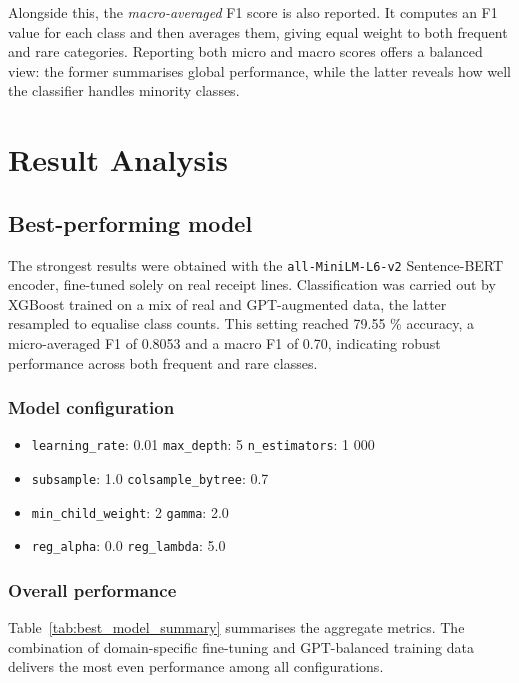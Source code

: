 \documentclass{SGGW-thesis-EN}
\begin{document}
Alongside this, the \emph{macro-averaged} F1 score is also reported. It computes an
F1 value for each class and then averages them, giving equal weight to both frequent and rare
categories. Reporting both micro and macro scores offers a balanced view: the former summarises global performance,
while the latter reveals how well the classifier handles minority classes.


\section{Result Analysis}
\subsection{Best-performing model}
The strongest results were obtained with the \texttt{all-MiniLM-L6-v2} Sentence-BERT encoder, fine-tuned solely on real
receipt lines.
Classification was carried out by XGBoost trained on a mix of real and GPT-augmented data, the latter resampled to
equalise class counts. This setting reached 79.55 \% accuracy, a micro-averaged F1 of 0.8053 and a
macro F1 of 0.70, indicating robust performance across both frequent and rare classes.

\subsubsection*{Model configuration}
\begin{itemize}
  \item \texttt{learning\_rate}: 0.01 \quad \texttt{max\_depth}: 5 \quad \texttt{n\_estimators}: 1 000
  \item \texttt{subsample}: 1.0 \quad \texttt{colsample\_bytree}: 0.7
  \item \texttt{min\_child\_weight}: 2 \quad \texttt{gamma}: 2.0
  \item \texttt{reg\_alpha}: 0.0 \quad \texttt{reg\_lambda}: 5.0
\end{itemize}

\subsubsection*{Overall performance}
Table~\ref{tab:best_model_summary} summarises the aggregate metrics. The combination of domain-specific fine-tuning and
GPT-balanced training data delivers the most even performance among all configurations.
\end{document}
